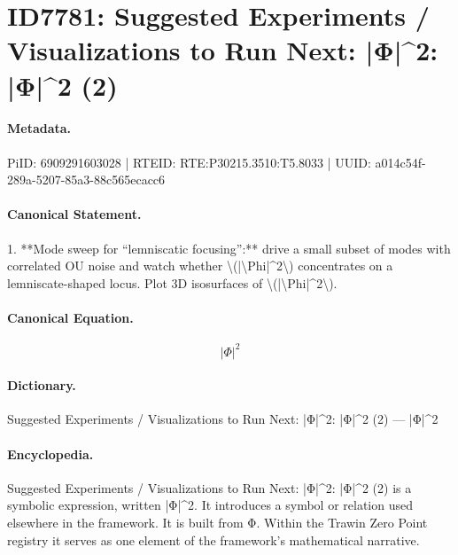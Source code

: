 \section*{ID7781: Suggested Experiments / Visualizations to Run Next: |Φ|\textasciicircum{}2: |Φ|\textasciicircum{}2 (2)}
\paragraph{Metadata.}
PiID: 6909291603028 | RTEID: RTE:P30215.3510:T5.8033 | UUID: a014c54f-289a-5207-85a3-88c565ecacc6

\paragraph{Canonical Statement.}
1. **Mode sweep for “lemniscatic focusing”:** drive a small subset of modes with correlated OU noise and watch whether \textbackslash{}(|\textbackslash{}Phi|\textasciicircum{}2\textbackslash{}) concentrates on a lemniscate-shaped locus. Plot 3D isosurfaces of \textbackslash{}(|\textbackslash{}Phi|\textasciicircum{}2\textbackslash{}).

\paragraph{Canonical Equation.}
\[
|\Phi|^2
\]

\paragraph{Dictionary.}
Suggested Experiments / Visualizations to Run Next: |Φ|\textasciicircum{}2: |Φ|\textasciicircum{}2 (2) — |Φ|\textasciicircum{}2

\paragraph{Encyclopedia.}
Suggested Experiments / Visualizations to Run Next: |Φ|\textasciicircum{}2: |Φ|\textasciicircum{}2 (2) is a symbolic expression, written |Φ|\textasciicircum{}2. It introduces a symbol or relation used elsewhere in the framework. It is built from Φ. Within the Trawin Zero Point registry it serves as one element of the framework's mathematical narrative.

